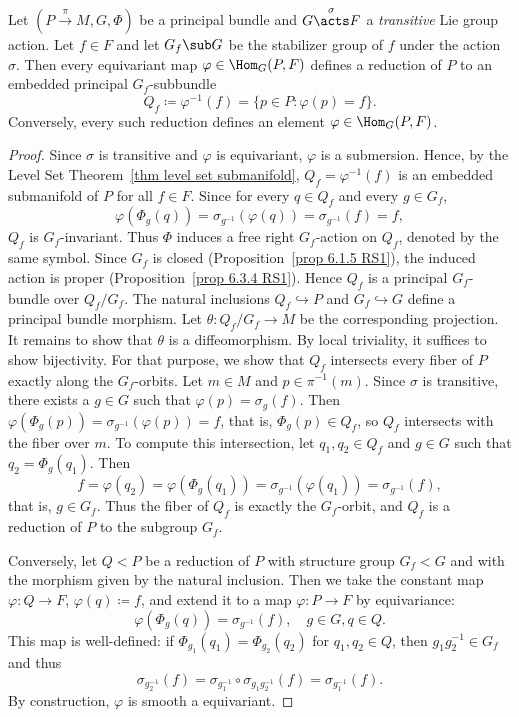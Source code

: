 \begin{prop}[{{\cite[Prop.~1.6.2]{RS2}}}]\label{prop 1.6.2 RS2}
    Let $(P\overset{\pi}{\to}M,G,\Phi)$ be a principal bundle and $G\overset{\sigma}{\acts}F$ a \emph{transitive} Lie group action. Let $f\in F$ and let $G_f\sub G$ be the stabilizer group of $f$ under the action $\sigma$. Then every equivariant map $\varphi\in\Hom_G(P,F)$ defines a reduction of $P$ to an embedded principal $G_f$-subbundle
    \[Q_f\coloneqq \varphi^{-1}(f)=\{p\in P:\varphi(p)=f\}.\]
    Conversely, every such reduction defines an element $\varphi\in \Hom_G(P,F)$.
\end{prop}
\begin{proof}
    Since $\sigma$ is transitive and $\varphi$ is equivariant, $\varphi$ is a submersion. Hence, by the Level Set Theorem~\ref{thm level set submanifold}, $Q_f=\varphi^{-1}(f)$ is an embedded submanifold of $P$ for all $f\in F$. Since for every $q\in Q_f$ and every $g\in G_f$,
    \[\varphi(\Phi_g(q))=\sigma_{g^{-1}}(\varphi(q))=\sigma_{g^{-1}}(f)=f,\]
    $Q_f$ is $G_f$-invariant. Thus $\Phi$ induces a free right $G_f$-action on $Q_f$, denoted by the same symbol. Since $G_f$ is closed (Proposition~\ref{prop 6.1.5 RS1}), the induced action is proper (Proposition~\ref{prop 6.3.4 RS1}). Hence $Q_f$ is a principal $G_f$-bundle over $Q_f\slash G_f$. The natural inclusions $Q_f\hookrightarrow P$ and $G_f\hookrightarrow G$ define a principal bundle morphism. Let $\theta:Q_f\slash G_f\to M$ be the corresponding projection. It remains to show that $\theta$ is a diffeomorphism. By local triviality, it suffices to show bijectivity. For that purpose, we show that $Q_f$ intersects every fiber of $P$ exactly along the $G_f$-orbits. Let $m\in M$ and $p\in\pi^{-1}(m)$. Since $\sigma$ is transitive, there exists a $g\in G$ such that $\varphi(p)=\sigma_g(f)$. Then $\varphi(\Phi_g(p))=\sigma_{g^{-1}}(\varphi(p))=f$, that is, $\Phi_g(p)\in Q_f$, so $Q_f$ intersects with the fiber over $m$. To compute this intersection, let $q_1,q_2\in Q_f$ and $g\in G$ such that $q_2=\Phi_g(q_1)$. Then
    \[f=\varphi(q_2)=\varphi(\Phi_g(q_1))=\sigma_{g^{-1}}(\varphi(q_1))=\sigma_{g^{-1}}(f),\]
    that is, $g\in G_f$. Thus the fiber of $Q_f$ is exactly the $G_f$-orbit, and $Q_f$ is a reduction of $P$ to the subgroup $G_f$.

    Conversely, let $Q<P$ be a reduction of $P$ with structure group $G_f<G$ and with the morphism given by the natural inclusion. Then we take the constant map $\varphi:Q\to F$, $\varphi(q)\coloneqq f$, and extend it to a map $\varphi:P\to F$ by equivariance:
    \[\varphi(\Phi_g(q))=\sigma_{g^{-1}}(f),\quad g\in G,q\in Q.\]
    This map is well-defined: if $\Phi_{g_1}(q_1)=\Phi_{g_2}(q_2)$ for $q_1,q_2\in Q$, then $g_1g_2^{-1}\in G_f$ and thus
    \[\sigma_{g_2^{-1}}(f)=\sigma_{g_1^{-1}}\circ\sigma_{g_1g_2^{-1}}(f)=\sigma_{g_1^{-1}}(f).\]
    By construction, $\varphi$ is smooth a equivariant.
\end{proof}

